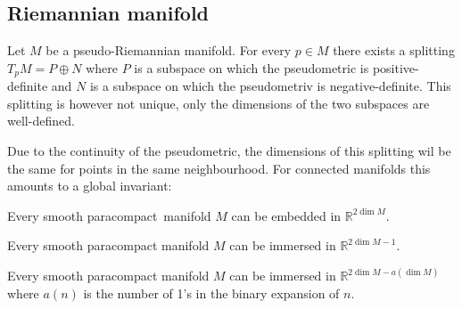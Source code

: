 \subsection{Riemannian manifold}

	
	
	\begin{property}
		Let $M$ be a pseudo-Riemannian manifold. For every $p\in M$ there exists a splitting $T_pM = P\oplus N$ where $P$ is a subspace on which the pseudometric is positive-definite and $N$ is a subspace on which the pseudometriv is negative-definite. This splitting is however not unique, only the dimensions of the two subspaces are well-defined.
	\end{property}
	Due to the continuity of the pseudometric, the dimensions of this splitting wil be the same for points in the same neighbourhood. For connected manifolds this amounts to a global invariant:
	
	\begin{theorem}
		Every smooth paracompact\footnotemark\ manifold $M$ can be embedded in $\mathbb{R}^{2\dim M}$.
	\end{theorem}
	\begin{theorem}
		Every smooth paracompact manifold $M$ can be immersed in $\mathbb{R}^{2\dim M - 1}$.
	\end{theorem}
	\begin{theorem}
		Every smooth paracompact manifold $M$ can be immersed in $\mathbb{R}^{2\dim M - a(\dim M)}$ where $a(n)$ is the number of 1's in the binary expansion of $n$.
	\end{theorem}

